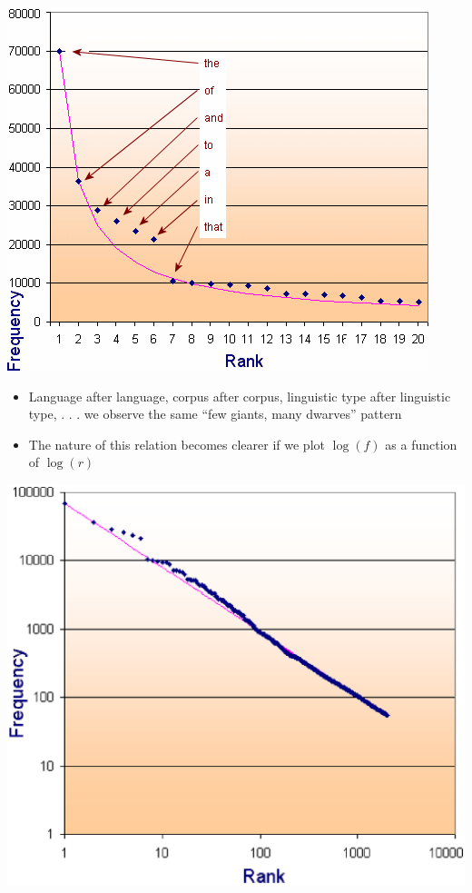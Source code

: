 \documentclass[a4paper,landscape,headrule,footrule,xetex]{foils}
\begin{document}
\vspace{2ex}\begin{center}
  \includegraphics[height=0.9\textheight]{include/bc-0}
\end{center}
\begin{itemize}
\item Language after language, corpus after corpus, linguistic
type after linguistic type, . . . we observe the same “few
giants, many dwarves” pattern
\item The nature of this relation becomes clearer if we plot $\log(f)$ as a
function of $\log(r)$
\end{itemize}

\newpage
\begin{center}
  \includegraphics[height=0.98\textheight]{include/bc-2}
\end{center}
\end{document}

